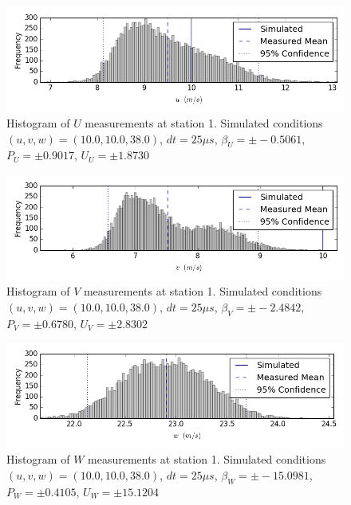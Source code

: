 \begin{figure}[H]
\centering
\includegraphics[width=6in]{figs/Ely_May28th01004/uncertainty_Ely_May28th01004_U}
\caption{Histogram of $U$ measurements at station 1. Simulated conditions $(u,v,w)=(10.0, 10.0, 38.0)$, $dt=25 \mu s$, $\beta_U=\pm -0.5061$, $P_U=\pm 0.9017$, $U_U=\pm 1.8730$}
\label{fig:uncertainty_Ely_May28th01004_U}
\end{figure}


\begin{figure}[H]
\centering
\includegraphics[width=6in]{figs/Ely_May28th01004/uncertainty_Ely_May28th01004_V}
\caption{Histogram of $V$ measurements at station 1. Simulated conditions $(u,v,w)=(10.0, 10.0, 38.0)$, $dt=25 \mu s$, $\beta_V=\pm -2.4842$, $P_V=\pm 0.6780$, $U_V=\pm 2.8302$}
\label{fig:uncertainty_Ely_May28th01004_V}
\end{figure}


\begin{figure}[H]
\centering
\includegraphics[width=6in]{figs/Ely_May28th01004/uncertainty_Ely_May28th01004_W}
\caption{Histogram of $W$ measurements at station 1. Simulated conditions $(u,v,w)=(10.0, 10.0, 38.0)$, $dt=25 \mu s$, $\beta_W=\pm -15.0981$, $P_W=\pm 0.4105$, $U_W=\pm 15.1204$}
\label{fig:uncertainty_Ely_May28th01004_W}
\end{figure}


